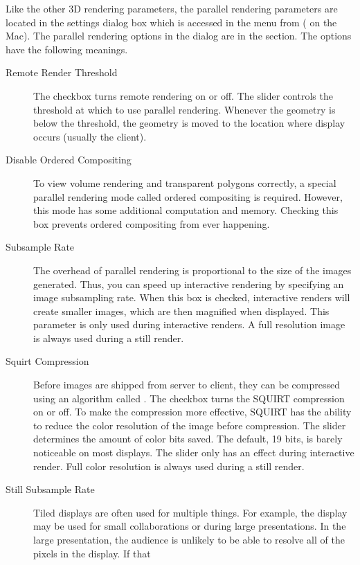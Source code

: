 Like the other 3D rendering parameters, the parallel rendering parameters
are located in the settings dialog box which is accessed in the menu from
 \ra {} ( \ra {} on the
Mac).  The parallel rendering options in the dialog are in the  \ra {} section.  The options have the following meanings.

\begin{description}
\item[Remote Render Threshold]  The checkbox
  turns remote rendering on or off.  The slider controls the threshold at
  which to use parallel rendering.  Whenever the geometry is below the
  threshold, the geometry is moved to the location where display occurs
  (usually the client).
\item[Disable Ordered Compositing]  To view
  volume rendering and transparent polygons correctly, a special parallel
  rendering mode called ordered compositing is required.  However, this
  mode has some additional computation and memory.  Checking this box
  prevents ordered compositing from ever happening.
\item[Subsample Rate]  The overhead of parallel rendering
  is proportional to the size of the images generated.  Thus, you can speed
  up interactive rendering by specifying an image subsampling rate.  When
  this box is checked, interactive renders will create smaller images,
  which are then magnified when displayed.  This parameter is only used
  during interactive renders.  A full resolution image is always used
  during a still render.
\item[Squirt Compression] Before images are shipped from server to client,
  they can be compressed using an algorithm called .  The
  checkbox turns the SQUIRT compression on or off.  To make the compression
  more effective, SQUIRT has the ability to reduce the color resolution of
  the image before compression.  The slider determines the amount of color
  bits saved.  The default, 19 bits, is barely noticeable on most displays.
  The slider only has an effect during interactive render.  Full color
  resolution is always used during a still render.
\item[Still Subsample Rate] Tiled displays are often used for multiple
  things.  For example, the display may be used for small collaborations or
  during large presentations.  In the large presentation, the audience is
  unlikely to be able to resolve all of the pixels in the display.  If that

\end{description}
